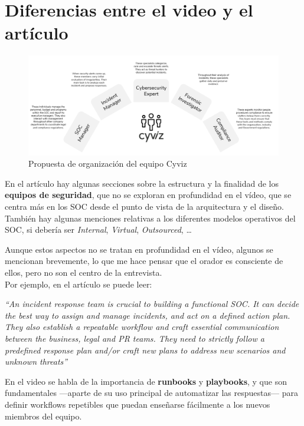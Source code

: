 \section{Diferencias entre el video y el artículo}
\begin{paracol}{2}
   

   \begin{figure}[htbp]
      \centering
      \includegraphics[width=0.95\columnwidth]{images/cyvizTeam.png}
      \caption{Propuesta de organización del equipo Cyviz}
      \label{fig:cyvizTeam}
   \end{figure}
   \switchcolumn
   \colfill
   En el artículo hay algunas secciones sobre la estructura y la finalidad de los \textbf{equipos de seguridad}, que no se exploran en profundidad en el vídeo, que se centra más en los SOC desde el punto de vista de la arquitectura y el diseño.\\
   También hay algunas menciones relativas a los diferentes modelos operativos del SOC, si debería ser \textit{Internal}, \textit{Virtual}, \textit{Outsourced}, \dots
   \colfill
\end{paracol}

Aunque estos aspectos no se tratan en profundidad en el vídeo, algunos se mencionan brevemente, lo que me hace pensar que el orador es consciente de ellos, pero no son el centro de la entrevista.\\
Por ejemplo, en el artículo se puede leer:
\begin{center}
   \textit{``An incident response team is crucial to building a functional SOC. It can decide the best way to assign and manage incidents, and
   act on a defined action plan. They also establish a repeatable workflow and craft essential communication between the business,
   legal and PR teams. They need to strictly follow a predefined response plan and/or craft new plans to address new scenarios and
   unknown threats''}
\end{center}

En el video se habla de la importancia de \textbf{runbooks} y \textbf{playbooks}, y que son fundamentales ---aparte de su uso principal de automatizar las respuestas--- para definir workflows repetibles que puedan enseñarse fácilmente a los nuevos miembros del equipo.

